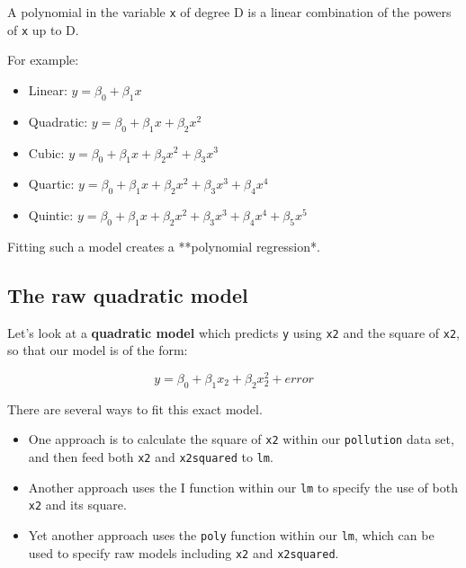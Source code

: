 \documentclass[]{book}
\providecommand{\tightlist}{%
  \setlength{\itemsep}{0pt}\setlength{\parskip}{0pt}}
\theoremstyle{definition}
\theoremstyle{definition}
\theoremstyle{definition}
\theoremstyle{remark}
\begin{document}
A polynomial in the variable \texttt{x} of degree D is a linear
combination of the powers of \texttt{x} up to D.

For example:

\begin{itemize}
\tightlist
\item
  Linear: \(y = \beta_0 + \beta_1 x\)
\item
  Quadratic: \(y = \beta_0 + \beta_1 x + \beta_2 x^2\)
\item
  Cubic: \(y = \beta_0 + \beta_1 x + \beta_2 x^2 + \beta_3 x^3\)
\item
  Quartic:
  \(y = \beta_0 + \beta_1 x + \beta_2 x^2 + \beta_3 x^3 + \beta_4 x^4\)
\item
  Quintic:
  \(y = \beta_0 + \beta_1 x + \beta_2 x^2 + \beta_3 x^3 + \beta_4 x^4 + \beta_5 x^5\)
\end{itemize}

Fitting such a model creates a **polynomial regression*.

\subsection{The raw quadratic model}\label{the-raw-quadratic-model}

Let's look at a \textbf{quadratic model} which predicts \texttt{y} using
\texttt{x2} and the square of \texttt{x2}, so that our model is of the
form:

\[
y = \beta_0 + \beta_1 x_2 + \beta_2 x_2^2 + error
\]

There are several ways to fit this exact model.

\begin{itemize}
\tightlist
\item
  One approach is to calculate the square of \texttt{x2} within our
  \texttt{pollution} data set, and then feed both \texttt{x2} and
  \texttt{x2squared} to \texttt{lm}.
\item
  Another approach uses the I function within our \texttt{lm} to specify
  the use of both \texttt{x2} and its square.
\item
  Yet another approach uses the \texttt{poly} function within our
  \texttt{lm}, which can be used to specify raw models including
  \texttt{x2} and \texttt{x2squared}.
\end{itemize}
\end{document}
